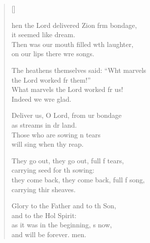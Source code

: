 \settowidth{\versewidth}{they come back, they come back, full of song, *}
\begin{verse}[\versewidth]
  \begin{patverse}
hen the Lord delivered Zion frm bondage,\Med\\
it seemed like  dream.\\
Then was our mouth filled w\pointup{\i}th laughter,\Med\\
on our lips there wre songs.

The heathens themselves said: “Wht marvels\Med\\
the Lord worked fr them!”\\
What marvels the Lord worked fr us!\Med\\
Indeed we wre glad.

Deliver us, O Lord, from ur bondage\Med\\
as streams in dr land.\\
Those who are sowing \pointup{\i}n tears\Med\\
will sing when thy reap.

They go out, they go out, full f tears,\Med\\
carrying seed for th sowing:\\
they come back, they come back, full f song,\Med\\
carrying thir sheaves.

Glory to the Father and to th Son,\Med\\
and to the Hol Spirit:\\
as it was in the beginning, \pointup{\i}s now,\Med\\
and will be forever. men. 
  \end{patverse}
\end{verse}
